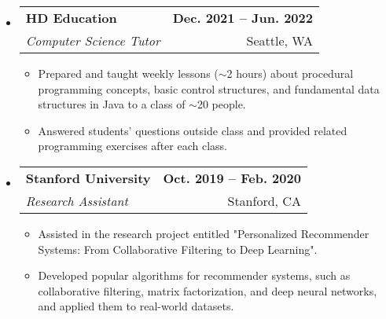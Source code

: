 \documentclass[letterpaper,11pt]{article}
\begin{document}
\begin{itemize}[nosep,label={},leftmargin=0in]
  \item
  \begin{tabularx}{\textwidth}{Xr@{}}
    \textbf{HD Education} & \textbf{Dec. 2021 -- Jun. 2022} \\
    \textit{Computer Science Tutor} & Seattle, WA
  \end{tabularx}
  \begin{itemize}[nosep]
    \item \small{Prepared and taught weekly lessons ($\sim$2 hours) about procedural programming concepts, basic control structures, and fundamental data structures in Java to a class of $\sim$20 people.}
    \item \small{Answered students’ questions outside class and provided related programming exercises after each class.}
  \end{itemize}

  \item
  \begin{tabularx}{\textwidth}{Xr@{}}
    \textbf{Stanford University} & \textbf{Oct. 2019 -- Feb. 2020} \\
    \textit{Research Assistant} & Stanford, CA
  \end{tabularx}
  \begin{itemize}[nosep]
    \item \small{Assisted in the research project entitled "Personalized Recommender Systems: From Collaborative Filtering to Deep Learning".}
    \item \small{Developed popular algorithms for recommender systems, such as collaborative filtering, matrix factorization, and deep neural networks, and applied them to real-world datasets.}
  \end{itemize}

\end{itemize}


\end{document}

